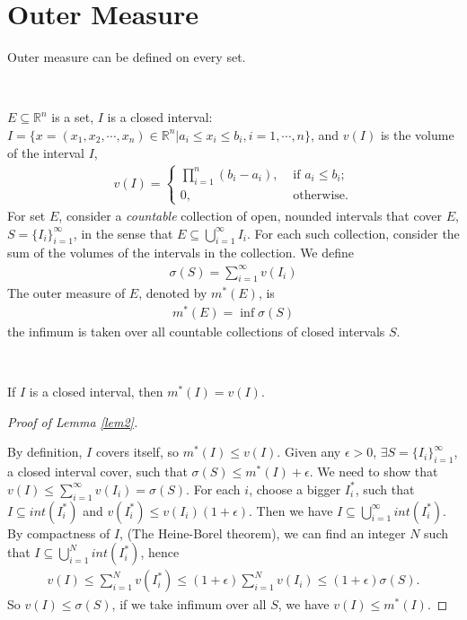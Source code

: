 \section{Outer Measure}
Outer measure can be defined on every set.
\begin{definition}
    \label{def:outer_measure}
    \

    $E \subseteq \mathbb{R}^n$ is a set,
    $I$ is a closed interval: $I = \{ x = (x_1, x_2, \cdots, x_n) \in \mathbb{R}^n | a_i \leq x_i \leq b_i, i=1, \cdots, n\}$,
    and $v(I)$ is the volume of the interval $I$, 
    \begin{gather*}
        v(I) = \begin{cases}
            \prod_{i=1}^n (b_i - a_i), &\text{ if } a_i \leq b_i ;\\
            0, &\text{ otherwise} .
        \end{cases}
    \end{gather*}
    For set $E$, consider a \textit{countable} collection of open, nounded intervals that cover $E$,
    $S = \{I_i\}_{i=1}^{\infty}$, in the sense that $E \subseteq \bigcup_{i=1}^{\infty} I_i$.
    For each such collection, consider the sum of the volumes of the intervals in the collection. 
    We define
    \begin{gather}
        \sigma(S) = \sum_{i=1}^{\infty} v(I_i)
    \end{gather}
    The outer measure of $E$, denoted by $m^{*}(E)$, is
    \begin{gather}
        m^{*}(E) = \inf \sigma(S)
    \end{gather}
    the infimum is taken over all countable collections of closed intervals $S$.
\end{definition}

\begin{lemma}\label{lem1}
    \

    If $I$ is a closed interval, then $m^{*}(I) = v(I).$
\end{lemma}
\begin{proof}[Proof of Lemma \ref{lem2}]
    \

    By definition, $I$ covers itself, so $m^{*}(I) \leq v(I)$.
    Given any $\epsilon > 0$,
    $\exists S = \{I_i\}_{i=1}^{\infty}$, a closed interval cover,
    such that $\sigma(S) \leq m^{*}(I) + \epsilon$.
    We need to show that $v(I) \leq \sum_{i=1}^{\infty} v(I_i) = \sigma(S).$
    For each $i$, choose a bigger $I_i^*$,
    such that $I \subseteq int(I_i^*)$ and $v(I_i^*) \leq v(I_i)(1 + \epsilon)$.
    Then we have $I \subseteq \bigcup_{i=1}^{\infty} int(I_i^*)$.
    By compactness of $I$, (The Heine-Borel theorem),
    we can find an integer $N$ such that $I \subseteq \bigcup_{i=1}^{N} int(I_i^*)$,
    hence
    \begin{gather*}
        v(I) \leq \sum_{i=1}^{N} v(I_i^*) \leq (1 + \epsilon) \sum_{i=1}^{N} v(I_i) \leq (1 + \epsilon) \sigma(S).
    \end{gather*}
    So $v(I) \leq \sigma(S)$, if we take infimum over all $S$,
    we have $v(I) \leq m^{*}(I)$.
\end{proof}